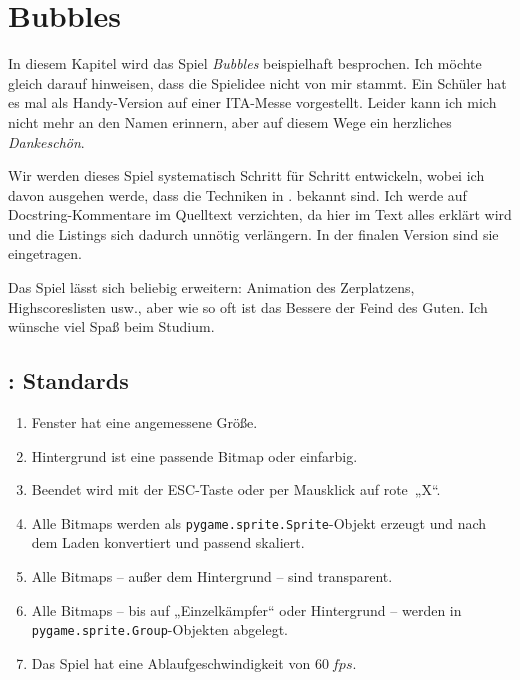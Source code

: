 \section{Bubbles}

In diesem Kapitel wird das Spiel \emph{Bubbles} beispielhaft besprochen. Ich möchte gleich darauf hinweisen, dass die Spielidee nicht von mir stammt. Ein Schüler hat es mal als Handy-Version auf einer ITA-Messe vorgestellt. Leider kann ich mich nicht mehr an den Namen erinnern, aber auf diesem Wege ein herzliches \emph{Dankeschön}. 

Wir werden dieses Spiel systematisch Schritt für Schritt entwickeln, wobei ich davon ausgehen werde, dass die Techniken in . bekannt sind. Ich werde auf Docstring-Kommentare im Quelltext verzichten, da hier im Text alles erklärt wird und die Listings sich dadurch unnötig verlängern. In der finalen Version sind sie eingetragen.

Das Spiel lässt sich beliebig erweitern: Animation des Zerplatzens, Highscoreslisten usw., aber wie so oft ist das Bessere der Feind des Guten. Ich wünsche viel Spaß beim Studium.

\subsection{: Standards}

\begin{enumerate}
    \item Fenster hat eine angemessene Größe.\label{reqStandardGröße}
    \item Hintergrund ist eine passende Bitmap oder einfarbig.\label{reqStandardHintergrund}
    \item Beendet wird mit der ESC-Taste oder per Mausklick auf rote~„X“.\label{reqStandardBeenden}
    \item Alle Bitmaps werden als \texttt{pygame.sprite.Sprite}-Objekt erzeugt und nach dem Laden konvertiert und passend skaliert.\label{reqStandardSprite}
    \item Alle Bitmaps -- außer dem Hintergrund -- sind transparent.\label{reqStandardTransparenz}
    \item Alle Bitmaps -- bis auf „Einzelkämpfer“ oder Hintergrund -- werden in \texttt{pygame.sprite.Group}-Objekten abgelegt.\label{reqStandardGruppe}
    \item Das Spiel hat eine Ablaufgeschwindigkeit von $60~fps$.\label{reqStandardFps}
\end{enumerate}
\er


